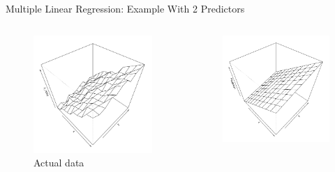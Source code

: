 \begin{frame}{Multiple Linear Regression: Example With 2 Predictors}
    \begin{columns}
        \begin{column}{0.5\linewidth}
            \begin{figure}
            \includegraphics[width=\linewidth]{R/plots/regression-2d-noisy}
            Actual data
            \end{figure}
        \end{column}
        \begin{column}{0.5\linewidth}
            \begin{figure}
            \includegraphics[width=\linewidth]{R/plots/regression-2d-clean}

\end{figure}
\end{column}
\end{columns}
\end{frame}
